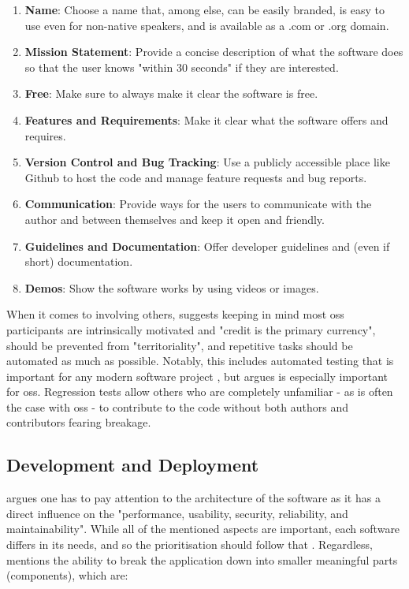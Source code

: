 \begin{enumerate}
    \item \textbf{Name}: Choose a name that, among else, can be easily branded, is easy to use even for non-native speakers, and is available as a .com or .org domain.
    \item \textbf{Mission Statement}: Provide a concise description of what the software does so that the user knows "within 30 seconds" \parencite{Fogel_2022} if they are interested.
    \item \textbf{Free}: Make sure to always make it clear the software is free.
    \item \textbf{Features and Requirements}: Make it clear what the software offers and requires.
    \item \textbf{Version Control and Bug Tracking}: Use a publicly accessible place like Github to host the code and manage feature requests and bug reports.
    \item \textbf{Communication}: Provide ways for the users to communicate with the author and between themselves and keep it open and friendly.
    \item \textbf{Guidelines and Documentation}: Offer developer guidelines and (even if short) documentation.
    \item \textbf{Demos}: Show the software works by using videos or images.
\end{enumerate}

When it comes to involving others, \textcite[Chapter~8]{Fogel_2022} suggests keeping in mind most \gls{oss} participants are intrinsically motivated and "credit is the primary currency", should be prevented from "territoriality", and repetitive tasks should be automated as much as possible.
Notably, this includes automated testing that is important for any modern software project \parencite[Chapter~9]{Sommerville_2019}, but \textcite[Chapter~8]{Fogel_2022} argues is especially important for \gls{oss}.
Regression tests allow others who are completely unfamiliar - as is often the case with \gls{oss} - to contribute to the code without both authors and contributors fearing breakage.

\subsection{Development and Deployment}

\textcite[Chapter~4]{Sommerville_2019} argues one has to pay attention to the architecture of the software as it has a direct influence on the "performance, usability, security, reliability, and maintainability".
While all of the mentioned aspects are important, each software differs in its needs, and so the prioritisation should follow that \parencite[Chapter~4]{Sommerville_2019}.
Regardless, \textcite[Chapter~4]{Sommerville_2019} mentions the ability to break the application down into smaller meaningful parts (components), which are:


